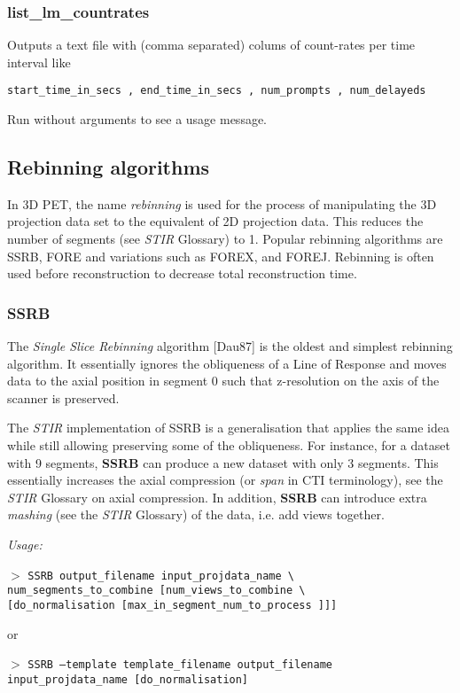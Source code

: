 \documentclass{article}
\newcommand{\cmdline}[1]{\par \noindent $>$ \texttt{#1}\par}
\begin{document}
\subsubsection{
list\_lm\_countrates}
Outputs a text file with (comma separated) colums of count-rates per
time interval like
\begin{verbatim}
start_time_in_secs , end_time_in_secs , num_prompts , num_delayeds
\end{verbatim}
Run without arguments to see a usage message.

\subsection{
Rebinning algorithms}

In 3D PET, the name \textit{rebinning} is used for the 
process of manipulating the 3D projection data set to the equivalent 
of 2D projection data. This reduces the number of segments (see 
\textit{STIR} Glossary) to 1. Popular rebinning algorithms are SSRB, FORE 
and variations such as FOREX, and FOREJ. Rebinning is often used 
before reconstruction to decrease total reconstruction time.


\subsubsection{
SSRB}
\label{sec:SSRB}
The \textit{Single Slice Rebinning} algorithm [Dau87] is the oldest 
and simplest rebinning algorithm. It essentially ignores the 
obliqueness of a Line of Response and moves data to the axial 
position in segment 0 such that z-resolution on the axis of the 
scanner is preserved.


The \textit{STIR} implementation of SSRB is a generalisation that applies 
the same idea while still allowing preserving some of the obliqueness. 
For instance, for a dataset with 9 segments, \textbf{SSRB} can produce 
a new dataset with only 3 segments. This essentially increases 
the axial compression (or \textit{span} in CTI terminology), see the 
\textit{STIR} Glossary on axial compression. In addition, \textbf{SSRB} can 
introduce extra \textit{mashing} (see the \textit{STIR} Glossary) of the data, 
i.e. add views together.


\textit{Usage:}

\cmdline{SSRB output\_filename input\_projdata\_name {\textbackslash} \\
num\_segments\_to\_combine [num\_views\_to\_combine {\textbackslash}\\
{[}do\_normalisation [max\_in\_segment\_num\_to\_process ]]]}
or
\cmdline{SSRB --template template\_filename output\_filename input\_projdata\_name [do\_normalisation]}
\end{document}

